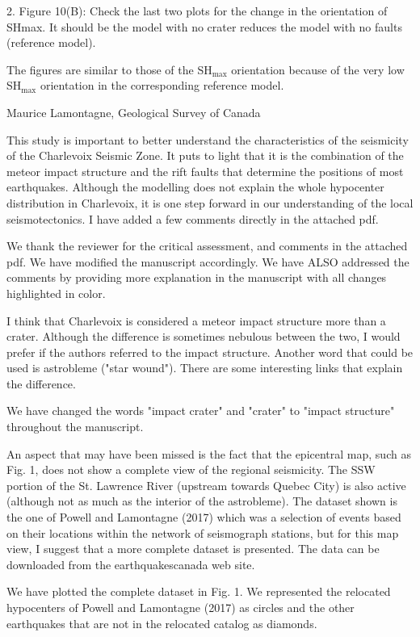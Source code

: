 \documentclass[12pt]{article}
\begin{document}
\begin{response}{2. Figure 10(B): Check the last two plots for the change in the orientation of SHmax. It should be the model with no crater reduces the model with no faults (reference model).}

  The figures are similar to those of the SH$_{\max}$ orientation because of the very low SH$_{\max}$ orientation in the corresponding reference model.
\end{response}




\begin{response}{Maurice Lamontagne, Geological Survey of Canada

This study is important to better understand the characteristics of the seismicity of the Charlevoix Seismic Zone. It puts to light that it is the combination of the meteor impact structure and the rift faults that determine the positions of most earthquakes. Although the modelling does not explain the whole hypocenter distribution in Charlevoix, it is one step forward in our understanding of the local seismotectonics. I have added a few comments directly in the attached pdf.}
    We thank the reviewer for the critical assessment, and comments in the attached pdf. We have modified the manuscript accordingly. We have ALSO addressed the comments by providing more explanation in the manuscript with all changes highlighted in color.
\end{response}


\begin{response}{I think that Charlevoix is considered a meteor impact structure more than a crater. Although the difference is sometimes nebulous between the two, I would prefer if the authors referred to the impact structure. Another word that could be used is astrobleme ("star wound"). There are some interesting links that explain the difference.}

  We have changed the words "impact crater" and "crater" to "impact structure" throughout the manuscript.
\end{response}

\begin{response}{An aspect that may have been missed is the fact that the epicentral map, such as Fig. 1, does not show a complete view of the regional seismicity. The SSW portion of the St. Lawrence River (upstream towards Quebec City) is also active (although not as much as the interior of the astrobleme). The dataset shown is the one of Powell and Lamontagne (2017) which was a selection of events based on their locations within the network of seismograph stations, but for this map view, I suggest that a more complete dataset is presented. The data can be downloaded from the earthquakescanada web site.}

  We have plotted the complete dataset in Fig. 1. We represented the relocated hypocenters of Powell and Lamontagne (2017) as circles and the other earthquakes that are not in the relocated catalog as diamonds.
\end{response}
\end{document}
